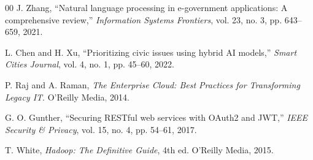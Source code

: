 \documentclass[conference]{IEEEtran}
\begin{document}
\begin{thebibliography}{00}
 J. Zhang, ``Natural language processing in e-government applications: A comprehensive review,'' \textit{Information Systems Frontiers}, vol. 23, no. 3, pp. 643--659, 2021.

 L. Chen and H. Xu, ``Prioritizing civic issues using hybrid AI models,'' \textit{Smart Cities Journal}, vol. 4, no. 1, pp. 45--60, 2022.

 P. Raj and A. Raman, \textit{The Enterprise Cloud: Best Practices for Transforming Legacy IT}. O'Reilly Media, 2014.

 G. O. Gunther, ``Securing RESTful web services with OAuth2 and JWT,'' \textit{IEEE Security \& Privacy}, vol. 15, no. 4, pp. 54--61, 2017.

 T. White, \textit{Hadoop: The Definitive Guide}, 4th ed. O'Reilly Media, 2015.

\end{thebibliography}

\vspace{14pt}
\end{document}
